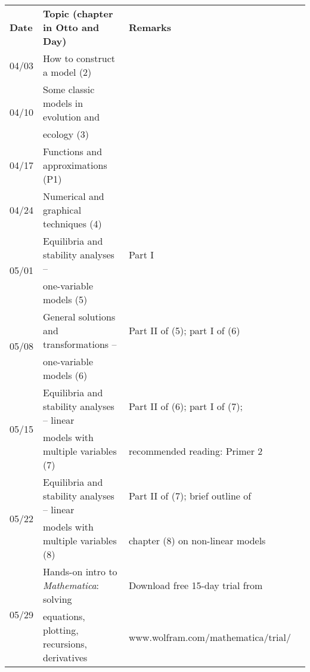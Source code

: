 \documentclass[
	letterpaper,
	12pt
]{article}
\begin{document}
\begin{table}[ht]
	\begin{tabular}{@{\extracolsep{\fill}}llll}
		\textbf{Date} & \textbf{Topic (chapter in Otto and Day)} & \textbf{Remarks} \\
		04/03 & How to construct a model (2) & \\
		
		\multirow{2}{*}{04/10} & Some classic models in evolution and& \multirow{2}{*}{}\\[-0.35cm]
		 & ecology (3) & \\
		
		04/17 & Functions and approximations (P1) &  \\
		
		04/24 & Numerical and graphical techniques (4) & \\
		
		\multirow{2}{*}{05/01} & Equilibria and stability analyses -- & Part I\\[-0.35cm]
		 & one-variable models (5) & \\
		
		\multirow{2}{*}{05/08} & General solutions and transformations -- & Part II of (5); part I of (6) \\[-0.35cm]
		 & one-variable models (6) & \\
		
		\multirow{2}{*}{05/15} & Equilibria and stability analyses -- linear & Part II of (6); part I of (7);\\[-0.35cm]
		 & models with multiple variables (7) & recommended reading: Primer 2\\
		
		\multirow{2}{*}{05/22} & Equilibria and stability analyses -- linear& Part II of (7); brief outline of \\[-0.35cm]
		 & models with multiple variables (8) & chapter (8) on non-linear models \\
		
		\multirow{2}{*}{05/29} & Hands-on intro to \emph{Mathematica}: solving & Download free 15-day trial from\\[-0.35cm]
		 & equations, plotting, recursions, derivatives & www.wolfram.com/mathematica/trial/ \\
		
	\end{tabular}
\end{table}
\end{document}
